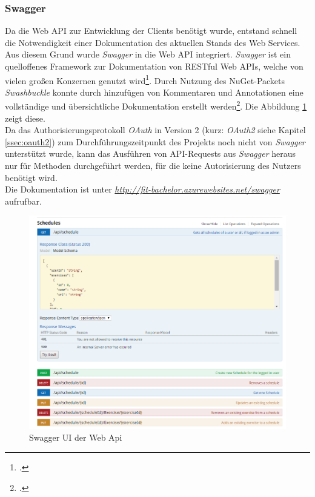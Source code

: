 \subsubsection*{Swagger}
\label{sssec:Swagger}
Da die Web \ac{API} zur Entwicklung der Clients benötigt wurde, entstand schnell die Notwendigkeit einer Dokumentation des aktuellen Stands des Web Services. \\
Aus diesem Grund wurde \textit{Swagger} in die Web \ac{API} integriert. \textit{Swagger} ist ein \linebreak quelloffenes Framework zur Dokumentation von \ac{REST}ful Web \ac{API}s, welche von vielen großen Konzernen genutzt wird\footcite{swagger}. Durch Nutzung des \gls{NuGet}-Packets \textit{Swashbuckle} konnte durch hinzufügen von Kommentaren und Annotationen eine vollständige und übersichtliche Dokumentation erstellt werden\footcite{implementing-Swagger}. Die Abbildung \ref{pic:swagger-UI} zeigt diese. \\
Da das Authorisierungsprotokoll \textit{OAuth} in Version 2 (kurz: \textit{OAuth2} siehe Kapitel \ref{ssec:oauth2}) zum Durchführungszeitpunkt des Projekts noch nicht von \textit{Swagger} unterstützt wurde, kann das Ausführen von \ac{API}-Requests aus \textit{Swagger} heraus nur für Methoden durchgeführt werden, für die keine Autorisierung des Nutzers benötigt wird. \\
Die Dokumentation ist unter \textit{\href{http://fit-bachelor.azurewebsites.net/swagger}{http://fit-bachelor.azurewebsites.net/swagger}} aufrufbar. 
\begin{figure}[!h]
\centering
\includegraphics[width=0.8\linewidth]{content/images/Swagger-UI-fIT}
\caption{Swagger UI der Web Api}
\label{pic:swagger-UI}
\end{figure}

